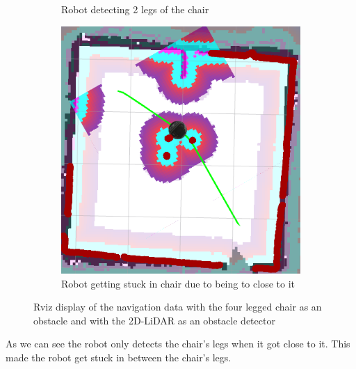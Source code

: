 \begin{figure}[ht!]
\begin{subfigure}[t]{0.32\linewidth}
    \caption{Robot detecting 2 legs of the chair}
    \label{fig::rviznchairscan2}
  \end{subfigure}
   \begin{subfigure}[t]{0.3\linewidth}
    \includegraphics[width=\linewidth]{imgs/chapter5/rviznchairscan2.png}
    \caption{Robot getting stuck in chair due to being to close to it}
    \label{fig::rviznchairscan3}
  \end{subfigure}
  \caption{Rviz display of the navigation data with the four legged chair as an obstacle and with the 2D-\ac{LiDAR} as an obstacle detector}
  \label{fig:rviznchairscan}
\end{figure}
 As we can see the robot only detects the chair's legs when it got close to it. This made the robot get stuck in between the chair's legs.

